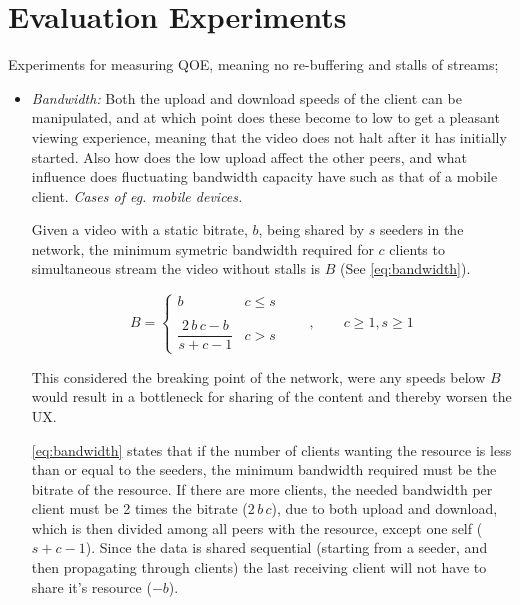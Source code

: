 \section{Evaluation Experiments}
\label{sec:des-evaluation}
Experiments for measuring \ac{QOE}, meaning no re-buffering and stalls of streams;
\begin{itemize}
    \item \textit{Bandwidth:}
    Both the upload and download speeds of the client can be manipulated, and at which point does these become to low to get a pleasant viewing experience, meaning that the video does not halt after it has initially started. Also how does the low upload affect the other peers, and what influence does fluctuating bandwidth capacity have such as that of a mobile client. \textit{Cases of eg. mobile devices.}
    
    Given a video with a static bitrate, $b$, being shared by $s$ seeders in the network, the minimum symetric bandwidth required for $c$ clients to simultaneous stream the video without stalls is $B$ (See \autoref{eq:bandwidth}).
    
    \begin{equation} \label{eq:bandwidth}
        B = 
        \begin{cases}
            b   &   c \leq s
        \\ \\
            \dfrac{2 \, b \, c - b}{s + c - 1}  &  c > s
        \end{cases}
        \qquad , \qquad 
        c \geq 1 ,
        s \geq 1 
    \end{equation}
    
    This considered the breaking point of the network, were any speeds below $B$ would result in a bottleneck for sharing of the content and thereby worsen the \ac{UX}.
    
    \autoref{eq:bandwidth} states that if the number of clients wanting the resource is less than or equal to the seeders, the minimum bandwidth required must be the bitrate of the resource. 
    If there are more clients, the needed bandwidth per client must be 2 times the bitrate ($2 \, b \, c$), due to both upload and download, which is then divided among all peers with the resource, except one self ($s+c-1$).
    Since the data is shared sequential (starting from a seeder, and then propagating through clients) the last receiving client will not have to share it's resource ($-b$). 
    

\end{itemize}

